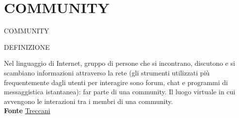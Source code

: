 \documentclass[aspectratio=1610]{beamer}
\begin{document}
\section{COMMUNITY}

\begin{frame}{COMMUNITY}
    \begin{alertblock}{DEFINIZIONE}
        \begin{minipage}{0.98\linewidth}
            \justifying
            Nel linguaggio di Internet, gruppo di persone che si incontrano, discutono e si scambiano 
            informazioni attraverso la rete (gli strumenti utilizzati più frequentemente dagli utenti per 
            interagire sono forum, chat e programmi di messaggistica istantanea): far parte di una community. 
            Il luogo virtuale in cui avvengono le interazioni tra i membri di una community.\\
            \bigskip
            \tiny{\textbf{Fonte}}
            \tiny{\href{https://www.treccani.it/vocabolario/community/}{Treccani}}
        \end{minipage}
    \end{alertblock}
\end{frame}
\end{document}
